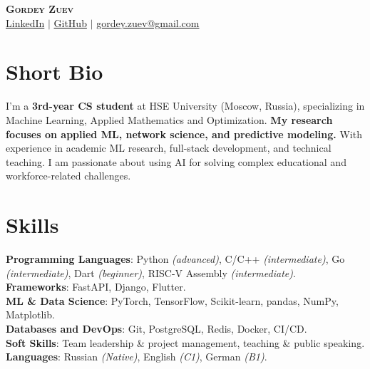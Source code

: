 \documentclass[letterpaper,11pt]{article}
\begin{document}
\begin{center}
    \textsc{\Huge{\textbf{Gordey Zuev}}} \\ \vspace{1pt}
    \href{{https://www.linkedin.com/in/gordey-zuev/}}{\textcolor{blue!50!black}{LinkedIn}} $|$
    \href{https://github.com/GordeyZuev}{\textcolor{blue!50!black}{GitHub}} $|$
    \href{mailto:gordey.zuev@gmail.com}{\textcolor{blue!50!black}{gordey.zuev@gmail.com}}
\end{center}


\section{Short Bio}
 \begin{itemize}[leftmargin=0.15in, label={}]
    \small{\item{
     {I’m a \textbf{3rd-year CS student} at HSE University (Moscow, Russia), specializing in Machine Learning, Applied Mathematics and Optimization. \textbf{My research focuses on applied ML, network science, and predictive modeling.} With experience in academic ML research, full-stack development, and technical teaching. I am passionate about using AI for solving complex educational and workforce-related challenges.}
    }}
 \end{itemize}


\section{Skills}
 \begin{itemize}[leftmargin=0.15in, label={}]
    \small{\item{
     \textbf{Programming Languages}{: Python \textit{(advanced)}, C/C++ \textit{(intermediate)}, Go \textit{(intermediate)}, Dart \textit{(beginner)}, RISC-V Assembly \textit{(intermediate)}.} \\
     
     \textbf{Frameworks}{: FastAPI, Django, Flutter.} \\
     
     \textbf{ML \& Data Science}{: PyTorch, TensorFlow, Scikit-learn, pandas, NumPy, Matplotlib.} \\
     
     \textbf{Databases and DevOps}{: Git, PostgreSQL, Redis, Docker, CI/CD.} \\
     
     \textbf{Soft Skills}{: Team leadership \& project management, teaching \& public speaking.} \\
     \textbf{Languages}{: Russian \textit{(Native)}, English \textit{(C1)}, German \textit{(B1)}.}
    }}
 \end{itemize}
\end{document}
